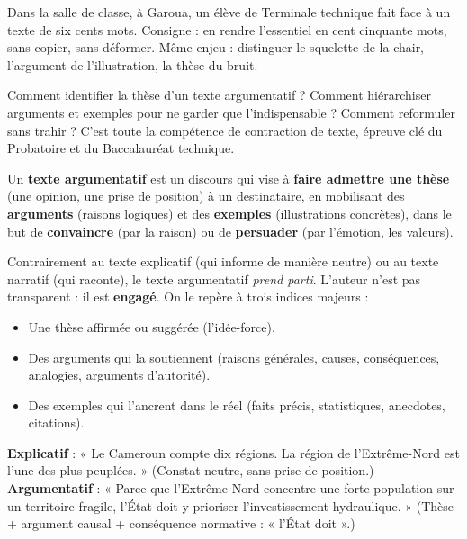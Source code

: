 \documentclass[11pt]{article}
\newcommand{\cle}[1]{{\popxbold\color{popdark}#1}}
\newcounter{popsec}
\newcounter{popsub}
\newcommand{\courssub}[1]{%
  \stepcounter{popsub}%
  \par\vspace{9pt}\noindent{\popxbold\fontsize{11.5}{13}\selectfont\color{popink}{\color{poporange}\thepopsec.\thepopsub}\hspace{6pt}#1}\par\nopagebreak\vspace{4pt}
}
\begin{document}
Dans la salle de classe, à Garoua, un élève de Terminale technique fait face à un texte de six cents mots. Consigne : en rendre l'essentiel en cent cinquante mots, sans copier, sans déformer. Même enjeu : distinguer le squelette de la chair, l'argument de l'illustration, la thèse du bruit.

\begin{aretenir}[Problématique]
Comment identifier la thèse d'un texte argumentatif ? Comment hiérarchiser arguments et exemples pour ne garder que l'indispensable ? Comment reformuler sans trahir ? C'est toute la compétence de \cle{contraction de texte}, épreuve clé du Probatoire et du Baccalauréat technique.
\end{aretenir}

\courssub{Qu'est-ce qu'un texte argumentatif ?}

\begin{definition}
Un \textbf{texte argumentatif} est un discours qui vise à \textbf{faire admettre une thèse} (une opinion, une prise de position) à un destinataire, en mobilisant des \textbf{arguments} (raisons logiques) et des \textbf{exemples} (illustrations concrètes), dans le but de \textbf{convaincre} (par la raison) ou de \textbf{persuader} (par l'émotion, les valeurs).
\end{definition}

Contrairement au texte explicatif (qui informe de manière neutre) ou au texte narratif (qui raconte), le texte argumentatif \emph{prend parti}. L'auteur n'est pas transparent : il est \textbf{engagé}. On le repère à trois indices majeurs :
\begin{itemize}
    \item Une \cle{thèse} affirmée ou suggérée (l'idée-force).
    \item Des \cle{arguments} qui la soutiennent (raisons générales, causes, conséquences, analogies, arguments d'autorité).
    \item Des \cle{exemples} qui l'ancrent dans le réel (faits précis, statistiques, anecdotes, citations).
\end{itemize}

\begin{exemplebox}
\textbf{Explicatif} : « Le Cameroun compte dix régions. La région de l'Extrême-Nord est l'une des plus peuplées. » (Constat neutre, sans prise de position.)
\textbf{Argumentatif} : « Parce que l'Extrême-Nord concentre une forte population sur un territoire fragile, l'État doit y prioriser l'investissement hydraulique. » (Thèse + argument causal + conséquence normative : « l'État doit ».)
\end{exemplebox}
\end{document}
